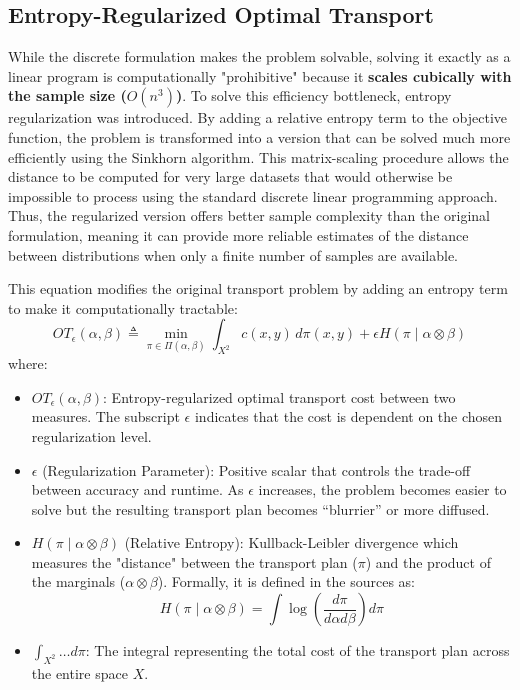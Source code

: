 \documentclass[11pt, a4paper]{article}
\theoremstyle{plain} %
\theoremstyle{definition} %
\begin{document}
		\subsection{Entropy-Regularized Optimal Transport}
		\label{sec:entropy-regularized_optimal_transport}
			While the discrete formulation makes the problem solvable, solving it exactly as a linear program is computationally "prohibitive" because it \textbf{scales cubically with the sample size ($O(n^3)$)}. To solve this efficiency bottleneck, entropy regularization was introduced. By adding a relative entropy term to the objective function, the problem is transformed into a version that can be solved much more efficiently using the Sinkhorn algorithm. This matrix-scaling procedure allows the distance to be computed for very large datasets that would otherwise be impossible to process using the standard discrete linear programming approach. Thus, the regularized version offers better sample complexity than the original formulation, meaning it can provide more reliable estimates of the distance between distributions when only a finite number of samples are available.

			This equation modifies the original transport problem by adding an entropy term to make it computationally tractable:
			\begin{equation}
				\label{eq:entropy_regularized_ot}
				OT_\epsilon(\alpha, \beta) \triangleq \min_{\pi \in \Pi(\alpha, \beta)} \int_{X^2} c(x, y) \, d\pi(x, y) + \epsilon H(\pi \mid \alpha \otimes \beta)
			\end{equation}
			where:
			\begin{itemize}
				\item $OT_\epsilon(\alpha, \beta)$: Entropy-regularized optimal transport cost between two measures. The subscript $\epsilon$ indicates that the cost is dependent on the chosen regularization level.
				\item $\epsilon$ (Regularization Parameter): Positive scalar that controls the trade-off between accuracy and runtime. As $\epsilon$ increases, the problem becomes easier to solve but the resulting transport plan becomes ``blurrier'' or more diffused.
				\item $H(\pi \mid \alpha \otimes \beta)$ (Relative Entropy): Kullback-Leibler divergence which measures the "distance" between the transport plan ($\pi$) and the product of the marginals ($\alpha \otimes \beta$). Formally, it is defined in the sources as:
				\begin{equation}
					\label{eq:relative_entropy}
					H(\pi \mid \alpha \otimes \beta) = \int \log\left(\frac{d\pi}{d\alpha d\beta}\right) d\pi
				\end{equation}
				\item $\int_{X^2} \dots d\pi$: The integral representing the total cost of the transport plan across the entire space $X$.
			\end{itemize}
\end{document}

